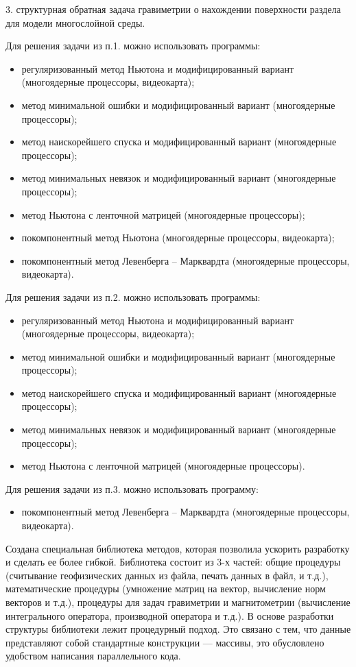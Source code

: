 3. структурная обратная задача гравиметрии о нахождении поверхности раздела для модели многослойной среды.

Для решения задачи из п.1. можно использовать программы:
\begin{itemize}
	\item регуляризованный метод Ньютона и модифицированный вариант (многоядерные процессоры, видеокарта);
	\item метод минимальной ошибки и модифицированный вариант (многоядерные процессоры);
	\item метод наискорейшего спуска и модифицированный вариант (многоядерные процессоры);
	\item метод минимальных невязок и модифицированный вариант (многоядерные процессоры);
	\item метод Ньютона с ленточной матрицей (многоядерные процессоры);
	\item покомпонентный метод Ньютона (многоядерные процессоры, видеокарта);
	\item покомпонентный метод Левенберга -- Марквардта (многоядерные процессоры, видеокарта).
\end{itemize} 

Для решения задачи из п.2. можно использовать программы:
\begin{itemize}
	\item регуляризованный метод Ньютона и модифицированный вариант (многоядерные процессоры, видеокарта);
	\item метод минимальной ошибки и модифицированный вариант (многоядерные процессоры);
	\item метод наискорейшего спуска и модифицированный вариант (многоядерные процессоры);
	\item метод минимальных невязок и модифицированный вариант (многоядерные процессоры);
	\item метод Ньютона с ленточной матрицей (многоядерные процессоры).
\end{itemize} 

Для решения задачи из п.3. можно использовать программу:
\begin{itemize}
	\item покомпонентный метод Левенберга -- Марквардта (многоядерные процессоры, видеокарта).
\end{itemize}

Создана специальная библиотека методов, которая позволила ускорить разработку и сделать ее более гибкой. Библиотека состоит из 3-х частей: общие процедуры (считывание геофизических данных из файла, печать данных в файл, и т.д.), математические процедуры (умножение матриц на вектор, вычисление норм векторов и т.д.), процедуры для задач гравиметрии и магнитометрии (вычисление интегрального оператора, производной оператора и т.д.). В основе разработки структуры библиотеки лежит процедурный подход. Это связано с тем, что данные представляют собой стандартные конструкции --- массивы, это обусловлено удобством написания параллельного кода.

